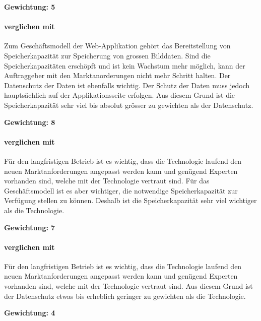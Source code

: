 \textbf{Gewichtung: 5}

\paragraph*{ verglichen mit }
Zum Geschäftsmodell der Web-Applikation gehört das Bereitstellung von Speicherkapazität zur Speicherung von grossen Bilddaten. Sind die Speicherkapazitäten erschöpft und ist kein Wachstum mehr möglich, kann der Auftraggeber mit den Marktanorderungen nicht mehr Schritt halten. Der Datenschutz der Daten ist ebenfalls wichtig. Der Schutz der Daten muss jedoch hauptsächlich auf der Applikationsseite erfolgen. Aus diesem Grund ist die Speicherkapazität sehr viel bis absolut grösser zu gewichten als der Datenschutz.

\textbf{Gewichtung: 8}

\paragraph*{ verglichen mit }
Für den langfristigen Betrieb ist es wichtig, dass die Technologie laufend den neuen Marktanforderungen angepasst werden kann und genügend Experten vorhanden sind, welche mit der Technologie vertraut sind. Für das Geschäftsmodell ist es aber wichtiger, die notwendige Speicherkapazität zur Verfügung stellen zu können. Deshalb ist die Speicherkapazität sehr viel wichtiger als die Technologie.

\textbf{Gewichtung: 7}

\paragraph*{ verglichen mit }
Für den langfristigen Betrieb ist es wichtig, dass die Technologie laufend den neuen Marktanforderungen angepasst werden kann und genügend Experten vorhanden sind, welche mit der Technologie vertraut sind. Aus diesem Grund ist der Datenschutz etwas bis erheblich geringer zu gewichten als die Technologie.

\textbf{Gewichtung: 4}

